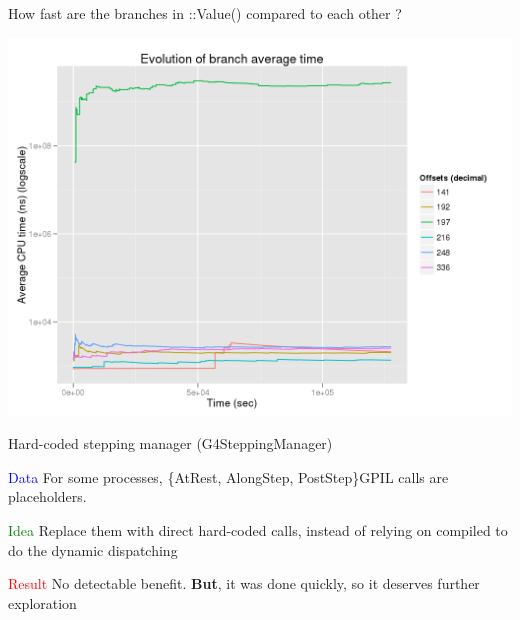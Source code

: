 \documentclass{beamer}
\begin{document}
\begin{frame}{How fast are the branches in ::Value() compared to each other ?}
\begin{center}
  \includegraphics[width=1.0\textwidth]{branch-time.png}
\end{center}
\end{frame}

\begin{frame}{Hard-coded stepping manager (G4SteppingManager)}

\textcolor{blue}{Data} For some processes, \{AtRest, AlongStep, PostStep\}GPIL calls are placeholders.

\vspace{5mm}

\textcolor{green}{Idea} Replace them with direct hard-coded calls, instead of relying on compiled to do the dynamic dispatching

\vspace{5mm}

\textcolor{red}{Result} No detectable benefit. {\bf But}, it was done quickly, so it deserves further exploration

\end{frame}
\end{document}
